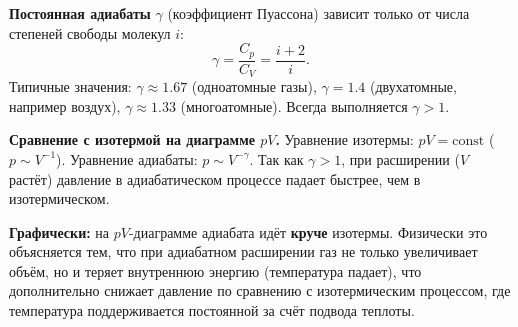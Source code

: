 \begin{property}
\textbf{Постоянная адиабаты} $\gamma$ (коэффициент Пуассона) зависит только от числа степеней свободы молекул $i$:
\begin{equation}
    \gamma = \frac{C_p}{C_V} = \frac{i+2}{i}.
\end{equation}
Типичные значения: $\gamma \approx 1.67$ (одноатомные газы), $\gamma = 1.4$ (двухатомные, например воздух), $\gamma \approx 1.33$ (многоатомные). Всегда выполняется $\gamma > 1$.
\end{property}

\begin{remark}
\textbf{Сравнение с изотермой на диаграмме $pV$.} Уравнение изотермы: $pV = \text{const}$ ($p \sim V^{-1}$). Уравнение адиабаты: $p \sim V^{-\gamma}$. Так как $\gamma > 1$, при расширении ($V$ растёт) давление в адиабатическом процессе падает быстрее, чем в изотермическом. 
\par\noindent\textbf{Графически:} на $pV$-диаграмме адиабата идёт \textbf{круче} изотермы. Физически это объясняется тем, что при адиабатном расширении газ не только увеличивает объём, но и теряет внутреннюю энергию (температура падает), что дополнительно снижает давление по сравнению с изотермическим процессом, где температура поддерживается постоянной за счёт подвода теплоты.
\end{remark}
